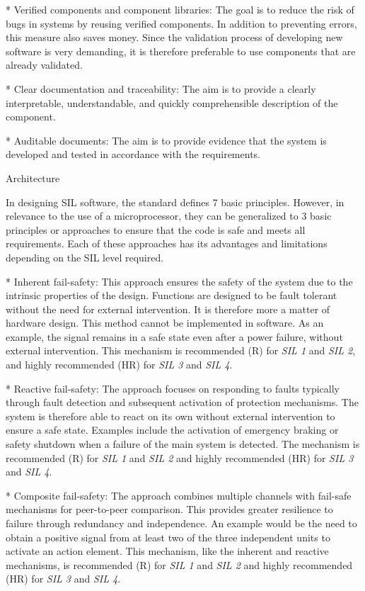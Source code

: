* {\sbf Verified components and component libraries}: The goal is to reduce the risk of bugs in systems by reusing verified components. In addition to preventing errors, this measure also saves money. Since the validation process of developing new software is very demanding, it is therefore preferable to use components that are already validated.

* {\sbf Clear documentation and traceability}: The aim is to provide a clearly interpretable, understandable, and quickly comprehensible description of the component.

* {\sbf Auditable documents}: The aim is to provide evidence that the system is developed and tested in accordance with the requirements.
\enditems

\secc Architecture

In designing SIL software, the standard defines 7 basic principles. However, in relevance to the use of a microprocessor, they can be generalized to 3 basic principles or approaches to ensure that the code is safe and meets all requirements. Each of these approaches has its advantages and limitations depending on the SIL level required.

\begitems
* {\sbf Inherent fail-safety}: This approach ensures the safety of the system due to the intrinsic properties of the design. Functions are designed to be fault tolerant without the need for external intervention. It is therefore more a matter of hardware design. This method cannot be implemented in software. As an example, the signal remains in a safe state even after a power failure, without external intervention. This mechanism is recommended (R) for {\it SIL 1} and {\it SIL 2}, and highly recommended (HR) for {\it SIL 3} and {\it SIL 4}.

* {\sbf Reactive fail-safety}: The approach focuses on responding to faults typically through fault detection and subsequent activation of protection mechanisms. The system is therefore able to react on its own without external intervention to ensure a safe state. Examples include the activation of emergency braking or safety shutdown when a failure of the main system is detected. The mechanism is recommended (R) for {\it SIL 1} and {\it SIL 2} and highly recommended (HR) for {\it SIL 3} and {\it SIL 4}.

* {\sbf Composite fail-safety}: The approach combines multiple channels with fail-safe mechanisms for peer-to-peer comparison. This provides greater resilience to failure through redundancy and independence. An example would be the need to obtain a positive signal from at least two of the three independent units to activate an action element. This mechanism, like the inherent and reactive mechanisms, is recommended (R) for {\it SIL 1} and {\it SIL 2} and highly recommended (HR) for {\it SIL 3} and {\it SIL 4}.
\enditems

